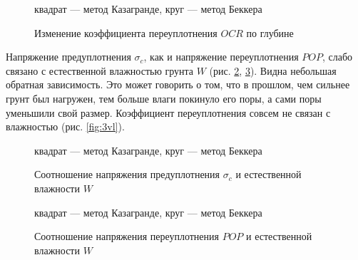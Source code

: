 \begin{figure}[h!]
  \caption{Изменение коэффициента переуплотнения $OCR$ по глубине}\label{fig:3gl}
  квадрат --- метод Казагранде, круг --- метод Беккера
\end{figure}

%
%


Напряжение предуплотнения $\sigma_c$, как и напряжение переуплотнения $POP$, слабо 
связано с естественной влажностью грунта $W$ (рис. \ref{fig:1vl}, \ref{fig:2vl}).
Видна небольшая обратная зависимость. Это может говорить о том, что 
в прошлом, чем сильнее грунт был нагружен, тем больше влаги 
покинуло его поры, а сами поры уменьшили свой размер.
Коэффициент переуплотнения совсем не связан с  
влажностью (рис. \ref{fig:3vl}).

\begin{figure}[h!]
  \caption{Соотношение напряжения предуплотнения $\sigma_c$ и естественной 
  влажности $W$}\label{fig:1vl}
  квадрат --- метод Казагранде, круг --- метод Беккера
\end{figure}

\begin{figure}[h!]
  \caption{Соотношение напряжения переуплотнения $POP$ и 
  естественной 
  влажности $W$}\label{fig:2vl}
  квадрат --- метод Казагранде, круг --- метод Беккера
\end{figure}

